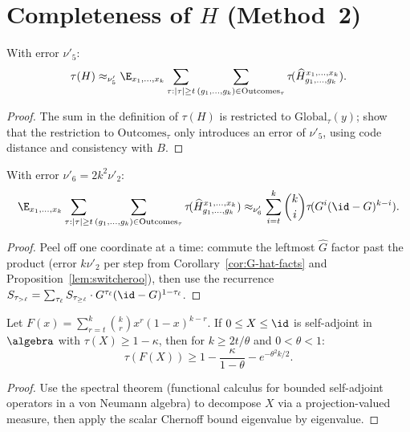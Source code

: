 \section{Completeness of $H$ (Method~2)}

\begin{lemma}\label{lem:over-all-outcomes}
  With error $\nu'_5$:
  \[
    \tau(H)\approx_{\nu'_5}
    \E_{x_1,\dots,x_k}\sum_{\tau:|\tau|\ge t}
    \sum_{(g_1,\dots,g_k)\in\mathrm{Outcomes}_\tau}
    \tau\!(\widehat{H}^{x_1,\dots,x_k}_{g_1,\dots,g_k}).
  \]
\end{lemma}
\begin{proof}
  The sum in the definition of $\tau(H)$ is restricted to
  $\mathrm{Global}_\tau(y)$; show that the restriction to
  $\mathrm{Outcomes}_\tau$ only introduces an error of $\nu'_5$,
  using code distance and consistency with $B$.
\end{proof}

\begin{lemma}\label{lem:from-H-to-G}
  With error $\nu'_6=2k^2\nu'_2$:
  \[
    \E_{x_1,\dots,x_k}\sum_{\tau:|\tau|\ge t}
    \sum_{(g_1,\dots,g_k)\in\mathrm{Outcomes}_\tau}
    \tau\!(\widehat{H}^{x_1,\dots,x_k}_{g_1,\dots,g_k})
    \approx_{\nu'_6}
    \sum_{i=t}^k\binom{k}{i}\tau\!(G^i(\id-G)^{k-i}).
  \]
\end{lemma}
\begin{proof}
  Peel off one coordinate at a time: commute the leftmost $\widehat{G}$
  factor past the product (error $k\nu'_2$ per step from
  Corollary~\ref{cor:G-hat-facts} and Proposition~\ref{lem:switcheroo}),
  then use the recurrence $S_{\tau_{>\ell}}=\sum_{\tau_\ell}S_{\tau_{\ge\ell}}\cdot G^{\tau_\ell}(\id-G)^{1-\tau_\ell}$.
\end{proof}

\begin{lemma}
  \label{lem:chernoff-bernoulli-matrix}
  Let $F(x)=\sum_{r=t}^k\binom{k}{r}x^r(1-x)^{k-r}$. If
  $0\le X\le\id$ is self-adjoint in $\algebra$ with $\tau(X)\ge 1-\kappa$,
  then for $k\ge 2t/\theta$ and $0<\theta<1$:
  \[
    \tau(F(X))\ge 1-\frac\kappa{1-\theta}-e^{-\theta^2 k/2}.
  \]
\end{lemma}
\begin{proof}
  Use the spectral theorem (functional calculus for bounded self-adjoint
  operators in a von Neumann algebra) to decompose $X$ via a
  projection-valued measure, then apply the scalar Chernoff bound
  eigenvalue by eigenvalue.
\end{proof}

